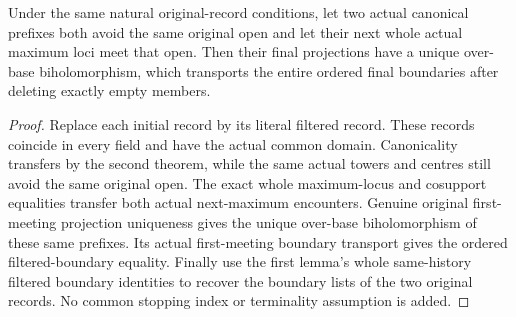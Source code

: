 \begin{theorem}
\label{hir:original-boundary-empty-filter-first-meeting-choice}
\leanok
Under the same natural original-record conditions, let two actual
canonical prefixes both avoid the same original open and let their next
whole actual maximum loci meet that open. Then their final projections
have a unique over-base biholomorphism, which transports the entire
ordered final boundaries after deleting exactly empty members.
\end{theorem}
\begin{proof}
Replace each initial record by its literal filtered record. These
records coincide in every field and have the actual common domain.
Canonicality transfers by the second theorem, while the same actual
towers and centres still avoid the same original open. The exact whole
maximum-locus and cosupport equalities transfer both actual next-maximum
encounters. Genuine original first-meeting projection uniqueness gives
the unique over-base biholomorphism of these same prefixes. Its actual
first-meeting boundary transport gives the ordered filtered-boundary
equality. Finally use the first lemma's whole same-history filtered
boundary identities to recover the boundary lists of the two original
records. No common stopping index or terminality assumption is added.
\end{proof}
